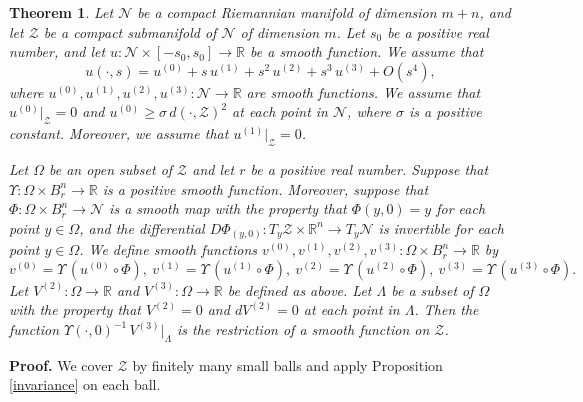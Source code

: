 \documentclass[11pt]{amsart}
\newtheorem{theorem}{Theorem}[section]
\theoremstyle{definition}
\begin{document}
\begin{theorem} 
\label{smooth.extension}
Let $\mathcal{N}$ be a compact Riemannian manifold of dimension $m+n$, and let $\mathcal{Z}$ be a compact submanifold of $\mathcal{N}$ of dimension $m$. Let $s_0$ be a positive real number, and let $u: \mathcal{N} \times [-s_0,s_0] \to \mathbb{R}$ be a smooth function. We assume that 
\[u(\cdot,s) = u^{(0)} + s \, u^{(1)} + s^2 \, u^{(2)} + s^3 \, u^{(3)} + O(s^4),\]
where $u^{(0)},u^{(1)},u^{(2)},u^{(3)}: \mathcal{N} \to \mathbb{R}$ are smooth functions. We assume that $u^{(0)}|_{\mathcal{Z}} = 0$ and $u^{(0)} \geq \sigma \, d(\cdot,\mathcal{Z})^2$ at each point in $\mathcal{N}$, where $\sigma$ is a positive constant. Moreover, we assume that $u^{(1)}|_{\mathcal{Z}} = 0$.

Let $\Omega$ be an open subset of $\mathcal{Z}$ and let $r$ be a positive real number. Suppose that $\Upsilon: \Omega \times B_r^n \to \mathbb{R}$ is a positive smooth function. Moreover, suppose that $\Phi: \Omega \times B_r^n \to \mathcal{N}$ is a smooth map with the property that $\Phi(y,0) = y$ for each point $y \in \Omega$, and the differential $D\Phi_{(y,0)}: T_y \mathcal{Z} \times \mathbb{R}^n \to T_y \mathcal{N}$ is invertible for each point $y \in \Omega$. We define smooth functions $v^{(0)},v^{(1)},v^{(2)},v^{(3)}: \Omega \times B_r^n \to \mathbb{R}$ by 
\[v^{(0)} = \Upsilon \, (u^{(0)} \circ \Phi),\ v^{(1)} = \Upsilon \, (u^{(1)} \circ \Phi),\ v^{(2)} = \Upsilon \, (u^{(2)} \circ \Phi),\ v^{(3)} = \Upsilon \, (u^{(3)} \circ \Phi).\] 
Let $V^{(2)}: \Omega \to \mathbb{R}$ and $V^{(3)}: \Omega \to \mathbb{R}$ be defined as above. Let $\Lambda$ be a subset of $\Omega$ with the property that $V^{(2)} = 0$ and $dV^{(2)} = 0$ at each point in $\Lambda$. Then the function $\Upsilon(\cdot,0)^{-1} \, V^{(3)}|_\Lambda$ is the restriction of a smooth function on $\mathcal{Z}$.
\end{theorem}

\textbf{Proof.} We cover $\mathcal{Z}$ by finitely many small balls and apply Proposition \ref{invariance} on each ball. \\
\end{document}
